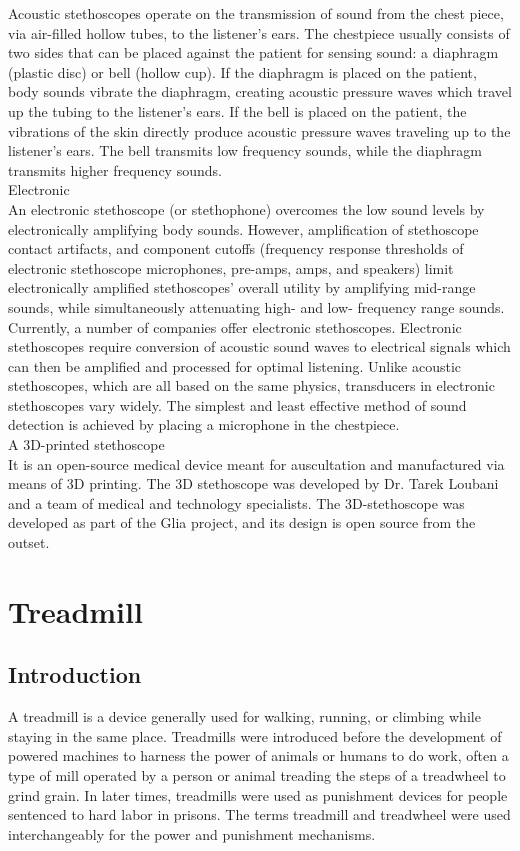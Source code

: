 \documentclass[12pt]{article}
\begin{document}
Acoustic stethoscopes operate on the transmission of sound from the chest piece, via air-filled hollow tubes, to the listener's ears. The chestpiece usually consists of two sides that can be placed against the patient for sensing sound: a diaphragm (plastic disc) or bell (hollow cup). If the diaphragm is placed on the patient, body sounds vibrate the diaphragm, creating acoustic pressure waves which travel up the tubing to the listener's ears. If the bell is placed on the patient, the vibrations of the skin directly produce acoustic pressure waves traveling up to the listener's ears. The bell transmits low frequency sounds, while the diaphragm transmits higher frequency sounds.\\
Electronic\\
An electronic stethoscope (or stethophone) overcomes the low sound levels by electronically amplifying body sounds. However, amplification of stethoscope contact artifacts, and component cutoffs (frequency response thresholds of electronic stethoscope microphones, pre-amps, amps, and speakers) limit electronically amplified stethoscopes' overall utility by amplifying mid-range sounds, while simultaneously attenuating high- and low- frequency range sounds. Currently, a number of companies offer electronic stethoscopes. Electronic stethoscopes require conversion of acoustic sound waves to electrical signals which can then be amplified and processed for optimal listening. Unlike acoustic stethoscopes, which are all based on the same physics, transducers in electronic stethoscopes vary widely. The simplest and least effective method of sound detection is achieved by placing a microphone in the chestpiece.\\

A 3D-printed stethoscope\\
It is an open-source medical device meant for auscultation and manufactured via means of 3D printing. The 3D stethoscope was developed by Dr. Tarek Loubani and a team of medical and technology specialists. The 3D-stethoscope was developed as part of the Glia project, and its design is open source from the outset. 

\section{Treadmill}
\subsection{Introduction}
A treadmill is a device generally used for walking, running, or climbing while staying in the same place. Treadmills were introduced before the development of powered machines to harness the power of animals or humans to do work, often a type of mill operated by a person or animal treading the steps of a treadwheel to grind grain. In later times, treadmills were used as punishment devices for people sentenced to hard labor in prisons. The terms treadmill and treadwheel were used interchangeably for the power and punishment mechanisms.
\end{document}
